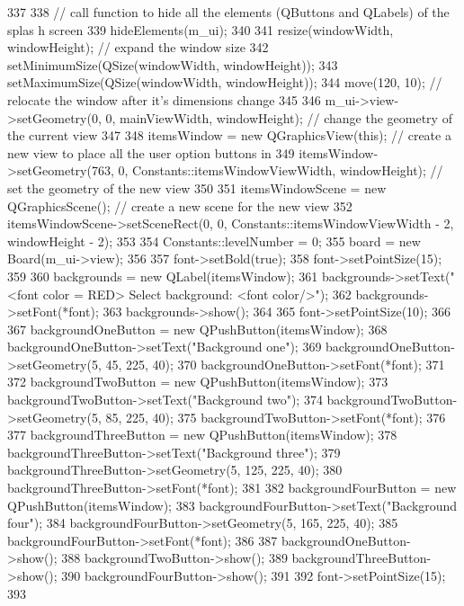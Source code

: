 \begin{DoxyCode}
337 {
338     // call function to hide all the elements (QButtons and QLabels) of the splas
      h screen
339     hideElements(m_ui);
340 
341     resize(windowWidth, windowHeight);          // expand the window size
342     setMinimumSize(QSize(windowWidth, windowHeight));
343     setMaximumSize(QSize(windowWidth, windowHeight));
344     move(120, 10);                              // relocate the window after it's
       dimensions change
345 
346     m_ui->view->setGeometry(0, 0, mainViewWidth, windowHeight);    // change the 
      geometry of the current view
347 
348     itemsWindow = new QGraphicsView(this);      // create a new view to place all
       the user option buttons in
349     itemsWindow->setGeometry(763, 0, Constants::itemsWindowViewWidth, 
      windowHeight);     // set the geometry of the new view
350 
351     itemsWindowScene = new QGraphicsScene();    // create a new scene for the new
       view
352     itemsWindowScene->setSceneRect(0, 0, Constants::itemsWindowViewWidth - 2, 
      windowHeight - 2);
353 
354     Constants::levelNumber = 0;
355     board = new Board(m_ui->view);
356 
357     font->setBold(true);
358     font->setPointSize(15);
359 
360     backgrounds = new QLabel(itemsWindow);
361     backgrounds->setText("<font color = RED> Select background: <font color/>");
362     backgrounds->setFont(*font);
363     backgrounds->show();
364 
365     font->setPointSize(10);
366 
367     backgroundOneButton = new QPushButton(itemsWindow);
368     backgroundOneButton->setText("Background one");
369     backgroundOneButton->setGeometry(5, 45, 225, 40);
370     backgroundOneButton->setFont(*font);
371 
372     backgroundTwoButton  = new QPushButton(itemsWindow);
373     backgroundTwoButton->setText("Background two");
374     backgroundTwoButton->setGeometry(5, 85, 225, 40);
375     backgroundTwoButton->setFont(*font);
376 
377     backgroundThreeButton  = new QPushButton(itemsWindow);
378     backgroundThreeButton->setText("Background three");
379     backgroundThreeButton->setGeometry(5, 125, 225, 40);
380     backgroundThreeButton->setFont(*font);
381 
382     backgroundFourButton  = new QPushButton(itemsWindow);
383     backgroundFourButton->setText("Background four");
384     backgroundFourButton->setGeometry(5, 165, 225, 40);
385     backgroundFourButton->setFont(*font);
386 
387     backgroundOneButton->show();
388     backgroundTwoButton->show();
389     backgroundThreeButton->show();
390     backgroundFourButton->show();
391 
392     font->setPointSize(15);
393 
}
\end{DoxyCode}
